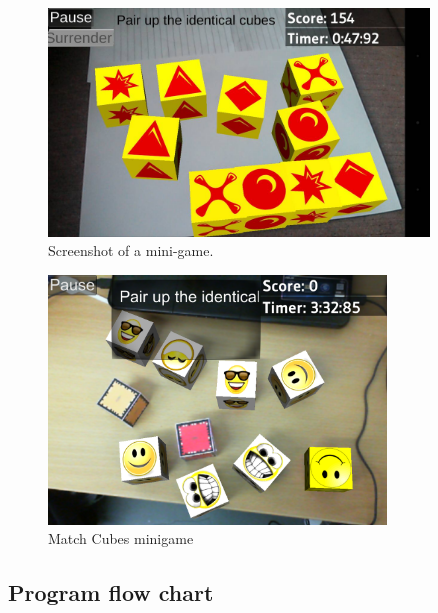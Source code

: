 \begin{figure}[h]
	\centering
	\begin{minipage}{.5\textwidth}
		\capstart
		\centering
		\includegraphics[width=0.9\textwidth]{images/match_cubes.jpg}
		\vspace{-10pt}
		\caption{Screenshot of a mini-game.}
		\label{fig:screenshot_mini-game}
	\end{minipage}
\end{figure}

\begin{figure}[ht]
	\capstart
	\centering
	\includegraphics[width=0.8\textwidth]{images/MatchCubes}
	\caption{Match Cubes minigame}
	\label{fig:match_cubes}
\end{figure}








\newpage
\subsection{Program flow chart}

